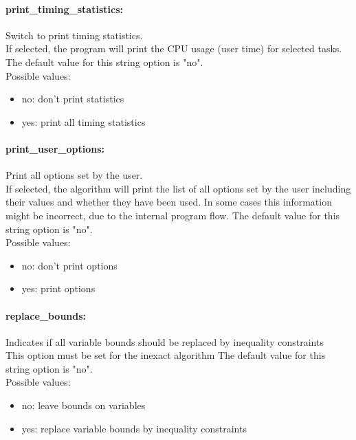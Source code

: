 \paragraph{print\_timing\_statistics:}\label{sec:print_timing_statistics} Switch to print timing statistics. $\;$ \\
 If selected, the program will print the CPU usage
(user time) for selected tasks.
The default value for this string option is "no".
\\ 
Possible values:
\begin{itemize}
   \item no: don't print statistics
   \item yes: print all timing statistics
\end{itemize}

\paragraph{print\_user\_options:}\label{sec:print_user_options} Print all options set by the user. $\;$ \\
 If selected, the algorithm will print the list of
all options set by the user including their
values and whether they have been used.  In some
cases this information might be incorrect, due to
the internal program flow.
The default value for this string option is "no".
\\ 
Possible values:
\begin{itemize}
   \item no: don't print options
   \item yes: print options
\end{itemize}

\paragraph{replace\_bounds:}\label{sec:replace_bounds} Indicates if all variable bounds should be replaced by inequality constraints $\;$ \\
 This option must be set for the inexact algorithm
The default value for this string option is "no".
\\ 
Possible values:
\begin{itemize}
   \item no: leave bounds on variables
   \item yes: replace variable bounds by inequality
constraints
\end{itemize}

